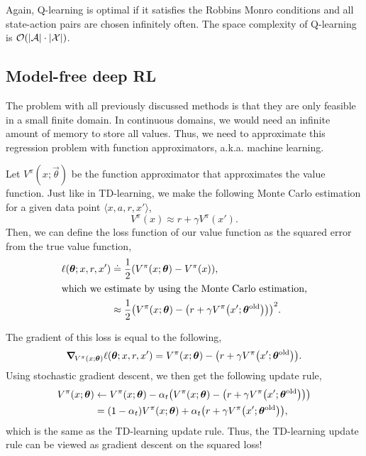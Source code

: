 Again, Q-learning is optimal if it satisfies the Robbins Monro conditions and
all state-action pairs are chosen infinitely often. The space complexity of
Q-learning is $\bigo{|\mathcal{A}| \cdot |\mathcal{X}|}$.

\subsection{Model-free deep RL}


The problem with all previously discussed methods is that they are only feasible
in a small finite domain. In continuous domains, we would need an infinite
amount of memory to store all values. Thus, we need to approximate this
regression problem with function approximators, a.k.a. machine learning.

Let $V^\pi(x;\vec{\theta})$ be the function approximator that approximates the
value function. Just like in TD-learning, we make the following Monte Carlo
estimation for a given data point $\langle x, a, r, x' \rangle$, \[
  V^\pi(x) \approx r + \gamma V^\pi(x').
\]
Then, we can define the loss function of our value function as the squared error
from the true value function,
\begin{align*}
  \ell(\vec{\theta} ; x, r, x') &\doteq \frac{1}{2} \lft( V^\pi(x;\vec{\theta}) - V^\pi(x) \rgt), \\
  \intertext{which we estimate by using the Monte Carlo estimation,}
  &\approx \frac{1}{2} \lft( V^\pi(x;\vec{\theta}) - \lft( r + \gamma V^\pi\lft(x'; \vec{\theta}^{\mathrm{old}}\rgt)\rgt) \rgt)^2.
\end{align*}

The gradient of this loss is equal to the following, \[
  \grad{\ell(\vec{\theta} ; x,r,x')}{V^\pi(x;\vec{\theta})} = V^\pi(x;\vec{\theta}) - \lft( r + \gamma V^\pi\lft(x'; \vec{\theta}^{\mathrm{old}}\rgt)\rgt).
\]
Using stochastic gradient descent, we then get the following update rule,
\begin{align*}
  V^\pi(x;\vec{\theta}) &\gets V^\pi(x;\vec{\theta}) - \alpha_t \lft(V^\pi(x;\vec{\theta}) - \lft( r + \gamma V^\pi\lft(x'; \vec{\theta}^{\mathrm{old}}\rgt)\rgt)\rgt) \\
  &= (1-\alpha_t) V^\pi(x;\vec{\theta}) + \alpha_t \lft( r + \gamma V^\pi\lft(x'; \vec{\theta}^{\mathrm{old}}\rgt)\rgt),
\end{align*}
which is the same as the TD-learning update rule. Thus, the TD-learning update
rule can be viewed as gradient descent on the squared loss!

